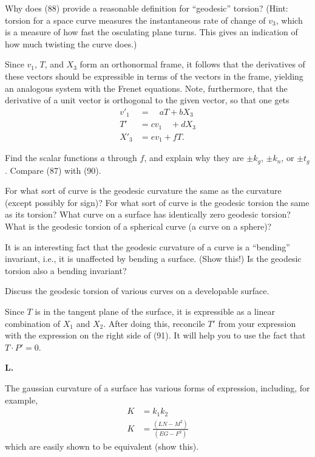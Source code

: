 \documentclass{book}
\begin{document}
Why does (88) provide a reasonable definition for ``geodesic'' torsion? (Hint: torsion for a space curve measures the instantaneous rate of change of $v_{3}$, which is a measure of how fast the osculating plane turns. This gives an indication of how much twisting the curve does.)

Since $v_{1}$, $T$, and $X_{3}$ form an orthonormal frame, it follows that the derivatives of these vectors should be expressible in terms of the vectors in the frame, yielding an analogous system with the Frenet equations. Note, furthermore, that the derivative of a unit vector is orthogonal to the given vector, so that one gets
\begin{align}
v'_{1} & = \quad aT + bX_{3} \\
T' & = cv_{1} \quad + dX_{3} \\
X'_{3} & = ev_{1} + fT. \quad
\end{align}

Find the scalar functions $a$ through $f$, and explain why they are $\pm k_{g}$, $\pm k_{n}$, or $\pm t_{g}$. Compare (87) with (90).

For what sort of curve is the geodesic curvature the same as the curvature (except possibly for sign)? For what sort of curve is the geodesic torsion the same as its torsion? What curve on a surface has identically zero geodesic torsion? What is the geodesic torsion of a spherical curve (a curve on a sphere)?

It is an interesting fact that the geodesic curvature of a curve is a ``bending'' invariant, i.e., it is unaffected by bending a surface. (Show this!) Is the geodesic torsion also a bending invariant?

Discuss the geodesic torsion of various curves on a developable surface.

Since $T$ is in the tangent plane of the surface, it is expressible as a linear combination of $X_{1}$ and $X_{2}$. After doing this, reconcile $T'$ from your expression with the expression on the right side of (91). It will help you to use the fact that $T \cdot P' = 0$.

\vspace{0.3cm}

\noindent \textbf{L.}

\vspace{0.3cm}

The gaussian curvature of a surface has various forms of expression, including, for example,
\begin{align*}
K & = k_{1} k_{2} \\
K & = \frac{(LN - M^{2})}{(EG - F^{2})}
\end{align*}
which are easily shown to be equivalent (show this).
\end{document}
